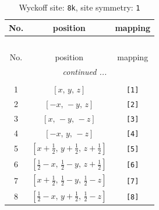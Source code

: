 \documentclass[fleqn,8pt]{jsarticle}
\begin{document}
\renewcommand{\arraystretch}{1.2}
\begin{longtable}{ccc}
\caption{Wyckoff site: {\tt 8k}, site symmetry: {\tt 1}}
 \\
 \hline \hline
No. & position & mapping \\ \hline \endfirsthead

\multicolumn{2}{l}{\tablename\ \thetable{}} \\
 \hline \hline
No. & position & mapping \\ \hline \endhead

 \hline \hline
\multicolumn{2}{r}{\footnotesize\it continued ...} \\ \endfoot

 \hline \hline
\multicolumn{2}{r}{} \\ \endlastfoot

1 & $\left[ x,\, y,\, z \right]$ & {\tt [1]} \\ \hline
2 & $\left[ - x,\, - y,\, z \right]$ & {\tt [2]} \\ \hline
3 & $\left[ x,\, - y,\, - z \right]$ & {\tt [3]} \\ \hline
4 & $\left[ - x,\, y,\, - z \right]$ & {\tt [4]} \\ \hline
5 & $\left[ x + \frac{1}{2},\, y + \frac{1}{2},\, z + \frac{1}{2} \right]$ & {\tt [5]} \\ \hline
6 & $\left[ \frac{1}{2} - x,\, \frac{1}{2} - y,\, z + \frac{1}{2} \right]$ & {\tt [6]} \\ \hline
7 & $\left[ x + \frac{1}{2},\, \frac{1}{2} - y,\, \frac{1}{2} - z \right]$ & {\tt [7]} \\ \hline
8 & $\left[ \frac{1}{2} - x,\, y + \frac{1}{2},\, \frac{1}{2} - z \right]$ & {\tt [8]} \\
\end{longtable}
\end{document}
